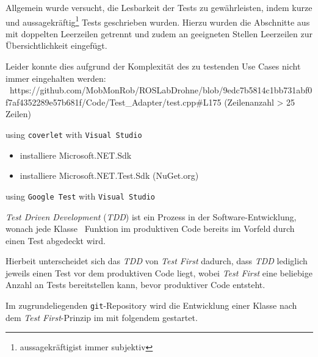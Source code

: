 Allgemein wurde versucht, die Lesbarkeit der Tests zu gewährleisten, indem kurze und aussagekräftig\footnote{\grq aussagekräftig\glq ist immer subjektiv} Tests geschrieben wurden.
Hierzu wurden die Abschnitte aus  mit doppelten Leerzeilen getrennt und zudem an geeigneten Stellen Leerzeilen zur Übersichtlichkeit eingefügt.

Leider konnte dies aufgrund der Komplexität des zu testenden Use Cases nicht immer eingehalten werden:
\zB\ https://github.com/MobMonRob/ROSLabDrohne/blob/9edc7b5814c1bb731abf0f7af4352289e57b681f/Code/Test\_Adapter/test.cpp\#L175 (Zeilenanzahl > 25 Zeilen)










using \texttt{coverlet} with \texttt{Visual Studio}



\begin{itemize}
\item installiere Microsoft.NET.Sdk
\item installiere Microsoft.NET.Test.Sdk (NuGet.org)



\end{itemize}


using \texttt{Google Test} with \texttt{Visual Studio}






\textit{Test Driven Development} (\textit{TDD}) ist ein Prozess in der Software-Entwicklung, wonach jede Klasse \bzw\ Funktion im produktiven Code bereits im Vorfeld durch einen Test abgedeckt wird.

Hierbeit unterscheidet sich das \textit{TDD} von \textit{Test First} dadurch, dass \textit{TDD} lediglich jeweils einen Test vor dem produktiven Code liegt, wobei \textit{Test First} eine beliebige Anzahl an Tests bereitstellen kann, bevor produktiver Code entsteht. 

Im zugrundeliegenden \texttt{git}-Repository wird die Entwicklung einer Klasse nach dem \textit{Test First}-Prinzip im  mit folgendem \Commit{} gestartet.

